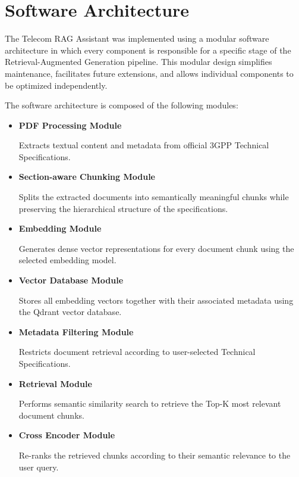 \section{Software Architecture}

The Telecom RAG Assistant was implemented using a modular software architecture in which every component is responsible for a specific stage of the Retrieval-Augmented Generation pipeline. This modular design simplifies maintenance, facilitates future extensions, and allows individual components to be optimized independently.

The software architecture is composed of the following modules:

\begin{itemize}

\item \textbf{PDF Processing Module}

Extracts textual content and metadata from official 3GPP Technical Specifications.

\item \textbf{Section-aware Chunking Module}

Splits the extracted documents into semantically meaningful chunks while preserving the hierarchical structure of the specifications.

\item \textbf{Embedding Module}

Generates dense vector representations for every document chunk using the selected embedding model.

\item \textbf{Vector Database Module}

Stores all embedding vectors together with their associated metadata using the Qdrant vector database.

\item \textbf{Metadata Filtering Module}

Restricts document retrieval according to user-selected Technical Specifications.

\item \textbf{Retrieval Module}

Performs semantic similarity search to retrieve the Top-K most relevant document chunks.

\item \textbf{Cross Encoder Module}

Re-ranks the retrieved chunks according to their semantic relevance to the user query.


\end{itemize}
